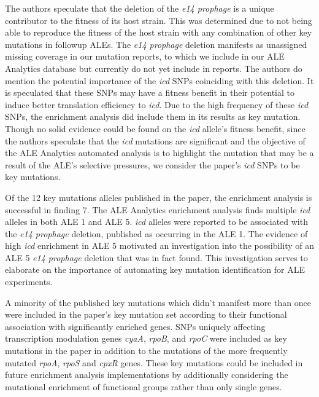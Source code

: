 \documentclass[12pt,final,masters,chapterheads]{ucsd}  %
\begin{document}
The authors speculate that the deletion of the \textit{e14 prophage} is a unique contributor to the fitness of its host strain. This was determined due to not being able to reproduce the fitness of the host strain with any combination of other key mutations in followup ALEs. The \textit{e14 prophage} deletion manifests as unassigned missing coverage in our mutation reports, to which we include in our ALE Analytics database but currently do not yet include in reports. The authors do mention the potential importance of the \textit{icd} SNPs coinciding with this deletion. It is speculated that these SNPs may have a fitness benefit in their potential to induce better translation efficiency to \textit{icd}. Due to the high frequency of these \textit{icd} SNPs, the enrichment analysis did include them in its results as key mutation. Though no solid evidence could be found on the \textit{icd} allele's fitness benefit, since the authors speculate that the \textit{icd} mutations are significant and the objective of the ALE Analytics automated analysis is to highlight the mutation that may be a result of the ALE's selective pressures, we consider the paper's \textit{icd} SNPs to be key mutations.

Of the 12 key mutations alleles published in the paper, the enrichment analysis is successful in finding 7. The ALE Analytics enrichment analysis finds multiple \textit{icd} alleles in both ALE 1 and ALE 5. \textit{icd} alleles were reported to be associated with the \textit{e14 prophage } deletion, published as occurring in the ALE 1. The evidence of high \textit{icd} enrichment in ALE 5 motivated an investigation into the possibility of an ALE 5 \textit{e14 prophage} deletion that was in fact found. This investigation serves to elaborate on the importance of automating key mutation identification for ALE experiments.

A minority of the published key mutations which didn't manifest more than once were included in the paper's key mutation set according to their functional association with significantly enriched genes. SNPs uniquely affecting transcription modulation genes \textit{cyaA}, \textit{rpoB}, and \textit{rpoC} were included as key mutations in the paper in addition to the mutations of the more frequently mutated \textit{rpoA}, \textit{rpoS} and \textit{cpxR} genes. These key mutations could be included in future enrichment analysis implementations by additionally considering the mutational enrichment of functional groups rather than only single genes.
\end{document}
